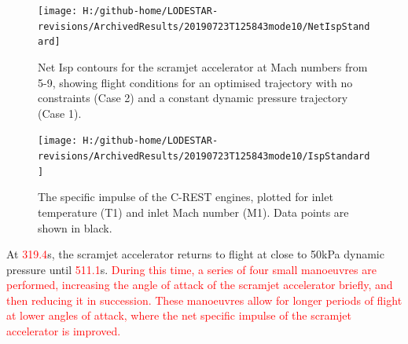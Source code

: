 \begin{figure}[ht!]%
	\centering
	\texttt{[image: H:/github-home/LODESTAR-revisions/ArchivedResults/20190723T125843mode10/NetIspStandard]}
	\caption{Net Isp contours for the scramjet accelerator at Mach numbers from 5-9, showing flight conditions for an optimised trajectory with no constraints (Case 2) and a constant dynamic pressure trajectory (Case 1). }
	\label{fig:NetIspStandardNoReturn}
\end{figure}

\begin{figure}[ht!]%
	\centering
	\texttt{[image: H:/github-home/LODESTAR-revisions/ArchivedResults/20190723T125843mode10/IspStandard]}
	\caption{The specific impulse of the C-REST engines, plotted for inlet temperature (T1) and inlet Mach number (M1). Data points are shown in black.}
	\label{fig:IspStandard}
\end{figure}


At \textcolor{red}{319.4}s, the scramjet accelerator returns to flight at close to 50kPa dynamic pressure until \textcolor{red}{511.1}s. \textcolor{red}{During this time, a series of four small manoeuvres are performed, increasing the angle of attack of the scramjet accelerator briefly, and then reducing it in succession. These manoeuvres allow for longer periods of flight at lower angles of attack, where the net specific impulse of the scramjet accelerator is improved. }
 
